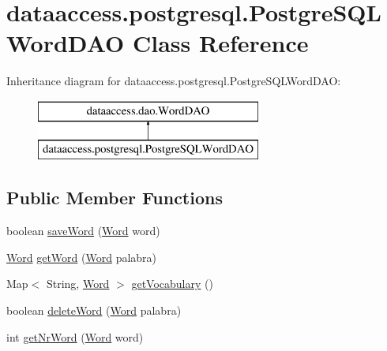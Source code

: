\hypertarget{classdataaccess_1_1postgresql_1_1_postgre_s_q_l_word_d_a_o}{\section{dataaccess.\-postgresql.\-Postgre\-S\-Q\-L\-Word\-D\-A\-O \-Class \-Reference}
\label{classdataaccess_1_1postgresql_1_1_postgre_s_q_l_word_d_a_o}
}
\-Inheritance diagram for dataaccess.\-postgresql.\-Postgre\-S\-Q\-L\-Word\-D\-A\-O\-:\begin{figure}[H]
\begin{center}
\leavevmode
\includegraphics[height=2.000000cm]{classdataaccess_1_1postgresql_1_1_postgre_s_q_l_word_d_a_o}
\end{center}
\end{figure}
\subsection*{\-Public \-Member \-Functions}
\begin{DoxyCompactItemize}
\item 
boolean \hyperlink{classdataaccess_1_1postgresql_1_1_postgre_s_q_l_word_d_a_o_af4dd5f009436282ecd62b19a19c2f133}{save\-Word} (\hyperlink{classcom_1_1utn_1_1searchengine_1_1_word}{\-Word} word)
\item 
\hyperlink{classcom_1_1utn_1_1searchengine_1_1_word}{\-Word} \hyperlink{classdataaccess_1_1postgresql_1_1_postgre_s_q_l_word_d_a_o_aabb6679c38d52dafecc1eb9135539fa2}{get\-Word} (\hyperlink{classcom_1_1utn_1_1searchengine_1_1_word}{\-Word} palabra)
\item 
\-Map$<$ \-String, \hyperlink{classcom_1_1utn_1_1searchengine_1_1_word}{\-Word} $>$ \hyperlink{classdataaccess_1_1postgresql_1_1_postgre_s_q_l_word_d_a_o_aa0a1f2db97af76ffa1067ce0769af6cb}{get\-Vocabulary} ()
\item 
boolean \hyperlink{classdataaccess_1_1postgresql_1_1_postgre_s_q_l_word_d_a_o_ae77df0affee89a844b40aa250af0658f}{delete\-Word} (\hyperlink{classcom_1_1utn_1_1searchengine_1_1_word}{\-Word} palabra)
\item 
int \hyperlink{classdataaccess_1_1postgresql_1_1_postgre_s_q_l_word_d_a_o_a8b9e63343f88e1ed973dd158701e66d8}{get\-Nr\-Word} (\hyperlink{classcom_1_1utn_1_1searchengine_1_1_word}{\-Word} word)
\end{DoxyCompactItemize}


